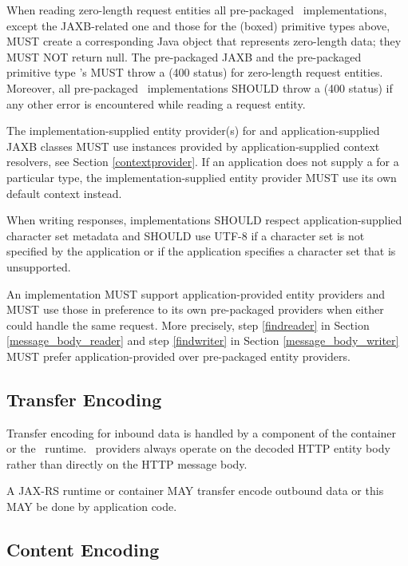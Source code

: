When reading zero-length request entities all pre-packaged \MsgRead\ implementations, except the JAXB-related one and those for the (boxed) primitive types above, MUST create a corresponding Java object that represents zero-length data; they MUST NOT return null. The pre-packaged JAXB and the pre-packaged primitive type \MsgRead's MUST throw a  (400 status) for zero-length request entities. Moreover, all pre-packaged \MsgRead\ implementations SHOULD throw a  (400 status) if any other error is encountered while reading a request entity.

The implementation-supplied entity provider(s) for  and application-supplied JAXB classes MUST use  instances provided by application-supplied context resolvers, see Section \ref{contextprovider}. If an application does not supply a  for a particular type, the implementation-supplied entity provider MUST use its own default context instead.

When writing responses, implementations SHOULD respect application-supplied character set metadata and SHOULD use UTF-8 if a character set is not specified by the application or if the application specifies a character set that is unsupported.

An implementation MUST support application-provided entity providers and MUST use those in preference to its own pre-packaged providers when either could handle the same request. More precisely, step \ref{findreader} in Section \ref{message_body_reader} and step \ref{findwriter} in Section \ref{message_body_writer} MUST prefer application-provided over pre-packaged entity providers.

\subsection{Transfer Encoding}
\label{transfer_encoding}

Transfer encoding for inbound data is handled by a component of the container or the \jaxrs\ runtime. \MsgRead\ providers always operate on the decoded HTTP entity body rather than directly on the HTTP message body.

A JAX-RS runtime or container MAY transfer encode outbound data or this MAY be done by application code.

\subsection{Content Encoding}

